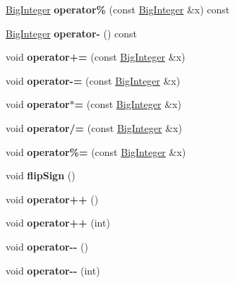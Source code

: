 \begin{DoxyCompactItemize}
\item 
\mbox{\label{class_big_integer_a0b695f48e789da02ab366569994191be}} 
\mbox{\hyperlink{class_big_integer}{Big\+Integer}} {\bfseries operator\%} (const \mbox{\hyperlink{class_big_integer}{Big\+Integer}} \&x) const
\item 
\mbox{\label{class_big_integer_ac884028762b53da3f61f099aecbae081}} 
\mbox{\hyperlink{class_big_integer}{Big\+Integer}} {\bfseries operator-\/} () const
\item 
\mbox{\label{class_big_integer_a49e70d67c0a825d9a18a0c2c49e41ff0}} 
void {\bfseries operator+=} (const \mbox{\hyperlink{class_big_integer}{Big\+Integer}} \&x)
\item 
\mbox{\label{class_big_integer_a7913148b4480c685ee837c6466a47ecb}} 
void {\bfseries operator-\/=} (const \mbox{\hyperlink{class_big_integer}{Big\+Integer}} \&x)
\item 
\mbox{\label{class_big_integer_a590e6e9e5aa571e52bb7b0b47604945e}} 
void {\bfseries operator$\ast$=} (const \mbox{\hyperlink{class_big_integer}{Big\+Integer}} \&x)
\item 
\mbox{\label{class_big_integer_ae6f62780970d982acb14c063b95fe598}} 
void {\bfseries operator/=} (const \mbox{\hyperlink{class_big_integer}{Big\+Integer}} \&x)
\item 
\mbox{\label{class_big_integer_a0f752a192f2244e7398418374f8aa98a}} 
void {\bfseries operator\%=} (const \mbox{\hyperlink{class_big_integer}{Big\+Integer}} \&x)
\item 
\mbox{\label{class_big_integer_a51fff1662d8fec38d0b9c6eb09789686}} 
void {\bfseries flip\+Sign} ()
\item 
\mbox{\label{class_big_integer_ac53529384000bd3ac6780099f958387b}} 
void {\bfseries operator++} ()
\item 
\mbox{\label{class_big_integer_a2ed0f5f50f60b81340f37eb5945f2f93}} 
void {\bfseries operator++} (int)
\item 
\mbox{\label{class_big_integer_a334141a8b7f2425ab53990f06d4e350f}} 
void {\bfseries operator-\/-\/} ()
\item 
\mbox{\label{class_big_integer_a50a4fe1e6fbc509d9914c68efd2f58f8}} 
void {\bfseries operator-\/-\/} (int)
\end{DoxyCompactItemize}

